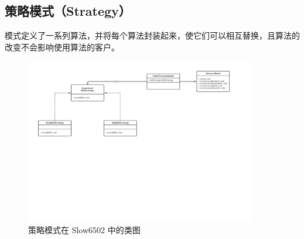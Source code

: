 \subsection{策略模式（Strategy）}

模式定义了一系列算法，并将每个算法封装起来，使它们可以相互替换，且算法的改变不会影响使用算法的客户。

\begin{figure}[htb]
    \centering
    \includegraphics[width=0.9\textwidth]{figures/策略模式.pdf}
    \caption{策略模式在 Slow6502 中的类图}
\end{figure}